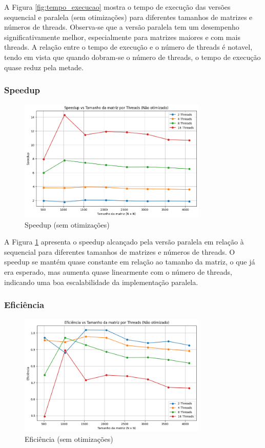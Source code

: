 \documentclass[12pt, a4paper]{article}
\begin{document}
	A Figura \ref{fig:tempo_execucao} mostra o tempo de execução das versões sequencial e paralela
	(sem otimizações) para diferentes tamanhos de matrizes e números de threads. Observa-se que a versão paralela
	tem um desempenho significativamente melhor, especialmente para matrizes maiores e com mais threads. A relação
	entre o tempo de execução e o número de threads é notavel, tendo em vista que quando dobram-se o número de threads,
	o tempo de execução quase reduz pela metade.

	\subsubsection{Speedup}

	\begin{figure}[H]
		\centering
		\includegraphics[width=0.8\textwidth]{img/speedup.png}
		\caption{Speedup (sem otimizações)}
		\label{fig:speedup}
	\end{figure}

	A Figura \ref{fig:speedup} apresenta o speedup alcançado pela versão paralela em relação à sequencial para diferentes
	tamanhos de matrizes e números de threads. O speedup se mantém quase constante em relação ao tamanho da matriz, o que
	já era esperado, mas aumenta quase linearmente com o número de threads, indicando uma boa escalabilidade da implementação paralela.

	\subsubsection{Eficiência}

	\begin{figure}[H]
		\centering
		\includegraphics[width=0.8\textwidth]{img/efficiency.png}
		\caption{Eficiência (sem otimizações)}
		\label{fig:eficiencia}
	\end{figure}
\end{document}
